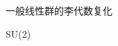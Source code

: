 

\begin{definition}{}

\end{definition}
\begin{example}{一般线性群的李代数复化}

\end{example}
\begin{example}{SU(2)}

\end{example}